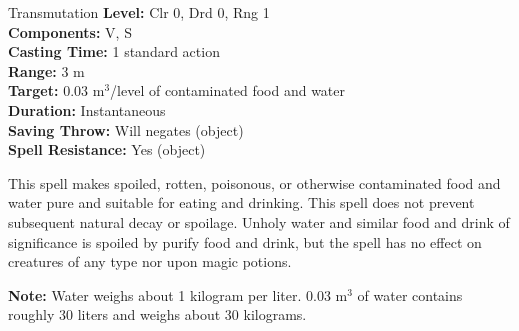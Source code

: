 {Transmutation}
{
	\textbf{Level:}
	Clr 0, Drd 0, Rng 1\\
	\textbf{Components:}
	V, S\\
	\textbf{Casting Time:}
	1 standard action\\
	\textbf{Range:}
	3 m\\
	\textbf{Target:}
	0.03 m$^3$/level of contaminated food and water\\
	\textbf{Duration:}
	Instantaneous\\
	\textbf{Saving Throw:}
	Will negates (object)\\
	\textbf{Spell Resistance:}
	Yes (object)\\
}
{
	This spell makes spoiled, rotten, poisonous, or otherwise contaminated food and water pure and suitable for eating and drinking. This spell does not prevent subsequent natural decay or spoilage. Unholy water and similar food and drink of significance is spoiled by purify food and drink, but the spell has no effect on creatures of any type nor upon magic potions.

	\textbf{Note:} Water weighs about 1 kilogram per liter. 0.03 m$^3$ of water contains roughly 30 liters and weighs about 30 kilograms.

}
